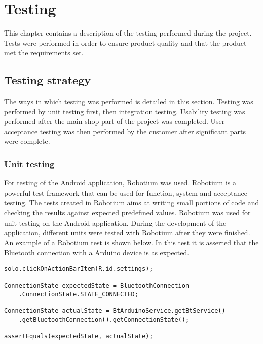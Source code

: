 \chapter{Testing}
	This chapter contains a description of the testing performed during the project. Tests were performed in order to ensure product quality and that the product met the requirements set.
	
	\section{Testing strategy}
		The ways in which testing was performed is detailed in this section. Testing was performed by unit testing first, then integration testing. Usability testing was performed after the main shop part of the project was completed. User acceptance testing was then performed by the customer after significant parts were complete. \cite{testing-overview}

		\subsection{Unit testing}
			For testing of the Android application, Robotium was used. Robotium is a powerful test framework that can be used for function, system and acceptance testing. The tests created in Robotium aims at writing small portions of code and checking the results against expected predefined values. Robotium was used for unit testing on the Android application. During the development of the application, different units were tested with Robotium after they were finished. An example of a Robotium test is shown below. In this test it is asserted that the Bluetooth connection with a Arduino device is as expected. \cite{unit-testing1} \cite{unit-testing2} \cite{unit-testing3} \\

			\begin{lstlisting}
solo.clickOnActionBarItem(R.id.settings);

ConnectionState expectedState = BluetoothConnection
	.ConnectionState.STATE_CONNECTED;
	
ConnectionState actualState = BtArduinoService.getBtService()
	.getBluetoothConnection().getConnectionState();

assertEquals(expectedState, actualState);
			\end{lstlisting}

